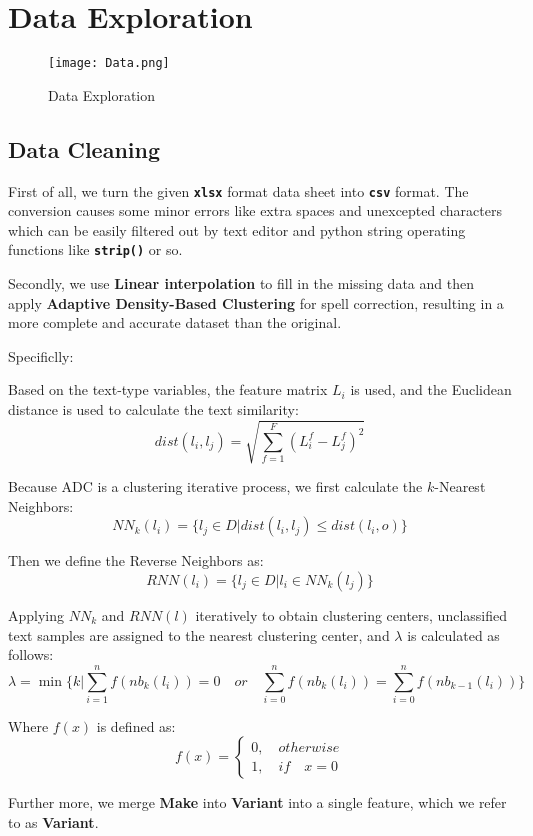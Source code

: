 \documentclass[12pt]{article}  %
\begin{document}
\section{Data Exploration}

\begin{figure}[htbp]
    \centering
    \texttt{[image: Data.png]}
    \caption{Data Exploration}\label{fig:Data}
\end{figure}

\subsection{Data Cleaning}
First of all, we turn the given \textbf{\texttt{xlsx}} format data sheet into \textbf{\texttt{csv}} format. 
The conversion causes some minor errors like extra spaces and unexcepted characters which can be easily filtered out by text editor and python string operating functions like \textbf{\texttt{strip()}} or so.

Secondly, we use \textbf{Linear interpolation} to fill in the missing data and then apply \textbf{Adaptive Density-Based Clustering} for spell correction,
resulting in a more complete and accurate dataset than the original.

Specificlly:

Based on the text-type variables, the feature matrix $L_i$ is used, and the Euclidean distance is used to calculate the text similarity:
$$dist(l_i,l_j)=\sqrt{\sum_{f=1}^{F}(L_i^f-L_j^f)^2}$$

Because ADC is a clustering iterative process, we first calculate the $k$-Nearest Neighbors:
$$NN_k(l_i)=\{l_j \in D|dist(l_i,l_j)\leq dist(l_i,o)\}$$

Then we define the Reverse Neighbors as:
$$RNN(l_i)=\{l_j \in D|l_i\in NN_k(l_j)\}$$

Applying $NN_k$ and $RNN(l)$ iteratively to obtain clustering centers, unclassified text samples are assigned to the nearest clustering center, and $\lambda$ is calculated as follows:
$$\lambda=\min\{k|\sum_{i=1}^{n}f(nb_k(l_i))=0\quad or\quad \sum_{i=0}^{n}f(nb_k(l_i))=\sum_{i=0}^{n}f(nb_{k-1}(l_i))\}$$

Where $f(x)$ is defined as:
$$f(x)=
\begin{cases}
0,\quad otherwise\\1,\quad if\quad x=0
\end{cases}$$

Further more, we merge \textbf{Make} into \textbf{Variant} into a single feature, which we refer to as \textbf{Variant}.
\end{document}
